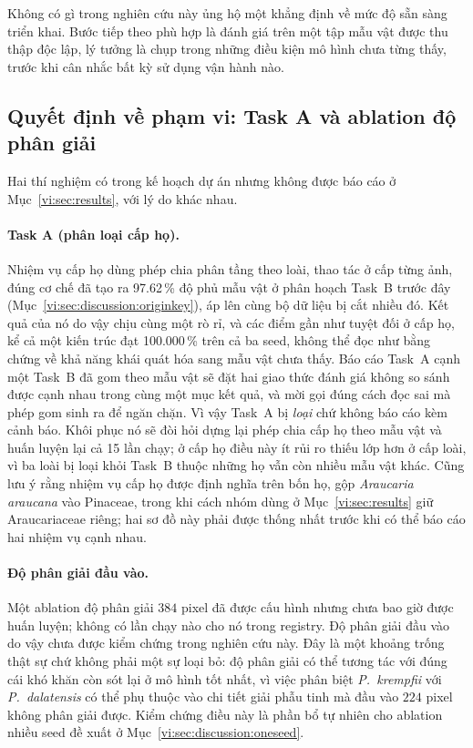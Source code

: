 Không có gì trong nghiên cứu này ủng hộ một khẳng định về mức độ sẵn sàng triển
khai. Bước tiếp theo phù hợp là đánh giá trên một tập mẫu vật được thu thập độc
lập, lý tưởng là chụp trong những điều kiện mô hình chưa từng thấy, trước khi
cân nhắc bất kỳ sử dụng vận hành nào.

\subsection{Quyết định về phạm vi: Task A và ablation độ phân giải}
\label{vi:sec:discussion:scope}

Hai thí nghiệm có trong kế hoạch dự án nhưng không được báo cáo ở
Mục~\ref{vi:sec:results}, với lý do khác nhau.

\paragraph{Task A (phân loại cấp họ).} Nhiệm vụ cấp họ dùng phép chia phân tầng
theo loài, thao tác ở cấp từng ảnh, đúng cơ chế đã tạo ra 97.62\,\% độ phủ
mẫu vật ở phân hoạch Task~B trước đây
(Mục~\ref{vi:sec:discussion:originkey}), áp lên cùng bộ dữ liệu bị cắt nhiều
đó. Kết quả của nó do vậy chịu cùng một rò rỉ, và các điểm gần như tuyệt đối ở
cấp họ, kể cả một kiến trúc đạt 100.000\,\% trên cả ba seed, không thể đọc như
bằng chứng về khả năng khái quát hóa sang mẫu vật chưa thấy. Báo cáo Task~A
cạnh một Task~B đã gom theo mẫu vật sẽ đặt hai giao thức đánh giá không so sánh
được cạnh nhau trong cùng một mục kết quả, và mời gọi đúng cách đọc sai mà phép
gom sinh ra để ngăn chặn. Vì vậy Task~A bị \emph{loại} chứ không báo cáo kèm
cảnh báo. Khôi phục nó sẽ đòi hỏi dựng lại phép chia cấp họ theo mẫu vật và
huấn luyện lại cả 15 lần chạy; ở cấp họ điều này ít rủi ro thiếu lớp hơn ở cấp
loài, vì ba loài bị loại khỏi Task~B thuộc những họ vẫn còn nhiều mẫu vật khác.
Cũng lưu ý rằng nhiệm vụ cấp họ được định nghĩa trên bốn họ, gộp
\textit{Araucaria araucana} vào Pinaceae, trong khi cách nhóm dùng ở
Mục~\ref{vi:sec:results} giữ Araucariaceae riêng; hai sơ đồ này phải được thống
nhất trước khi có thể báo cáo hai nhiệm vụ cạnh nhau.

\paragraph{Độ phân giải đầu vào.} Một ablation độ phân giải $384$ pixel đã được
cấu hình nhưng chưa bao giờ được huấn luyện; không có lần chạy nào cho nó trong
registry. Độ phân giải đầu vào do vậy chưa được kiểm chứng trong nghiên cứu
này. Đây là một khoảng trống thật sự chứ không phải một sự loại bỏ: độ phân
giải có thể tương tác với đúng cái khó khăn còn sót lại ở mô hình tốt nhất, vì
việc phân biệt \textit{P.\ krempfii} với \textit{P.\ dalatensis} có thể phụ
thuộc vào chi tiết giải phẫu tinh mà đầu vào $224$ pixel không phân giải được.
Kiểm chứng điều này là phần bổ tự nhiên cho ablation nhiều seed đề xuất ở
Mục~\ref{vi:sec:discussion:oneseed}.
